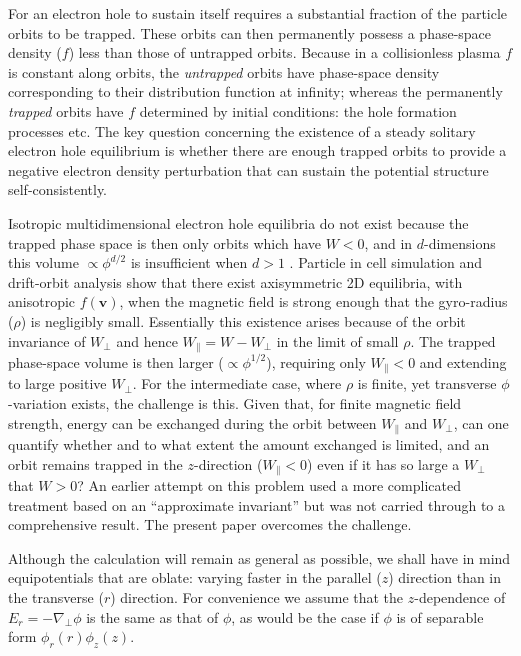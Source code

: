 \documentclass{agujournal2019}
\def\citep{\cite}
\begin{document}
For an electron hole to sustain itself requires a substantial
fraction of the particle orbits to be trapped. These orbits can then
permanently possess a phase-space density ($f$) less than those of
untrapped orbits. Because in a collisionless plasma $f$ is constant
along orbits, the \emph{untrapped} orbits have phase-space density
corresponding to their distribution function at infinity; whereas the
permanently \emph{trapped} orbits have $f$ determined by initial conditions:
the hole formation processes etc. The key question concerning the
existence of a steady solitary electron hole equilibrium is whether
there are enough trapped orbits to provide a negative electron density
perturbation that can sustain the potential structure
self-consistently.

Isotropic multidimensional electron hole equilibria do not exist
because the trapped phase space is then only orbits which have $W<0$,
and in $d$-dimensions this volume $\propto \phi^{d/2}$ is insufficient
when $d>1$ \citep{Krasovsky2004,Ng2005,Ng2006}.  Particle in cell
simulation and drift-orbit analysis show that there exist axisymmetric
2D equilibria, with anisotropic $f(\bm{v})$, when the magnetic field is strong
enough that the gyro-radius ($\rho$) is negligibly small. Essentially
this existence arises because of the orbit invariance of $W_\perp$ and
hence $W_\parallel=W-W_\perp$ in the limit of small $\rho$. The
trapped phase-space volume is then larger ($\propto \phi^{1/2}$), requiring only
$W_\parallel <0$ and extending to large positive $W_\perp$.  For the
intermediate case, where $\rho$ is finite, yet transverse
$\phi$-variation exists, the challenge is this. Given that, for finite
magnetic field strength, energy can be exchanged during the orbit
between $W_\parallel$ and $W_\perp$, can one quantify whether and to
what extent the amount exchanged is limited, and an orbit remains
trapped in the $z$-direction ($W_\parallel<0$) even if it has so large
a $W_\perp$ that $W>0$? An earlier attempt on this problem used a more
complicated treatment based on an ``approximate invariant''
\citep{Krasovsky2006} but was not carried through to a comprehensive
result. The present paper overcomes the challenge.

Although the calculation will remain as general as possible, we shall
have in mind equipotentials that are oblate: varying faster in the
parallel ($z$) direction than in the transverse ($r$) direction.
For convenience we assume that the $z$-dependence of
$E_r=-\nabla_\perp \phi$ is the same as that of $\phi$, as would be
the case if $\phi$ is of separable form $\phi_r(r)\phi_z(z)$.
\end{document}
